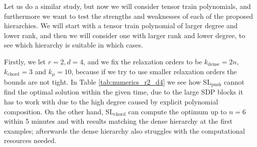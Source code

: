 \documentclass[11pt,a4paper]{article}
\theoremstyle{definition}
\begin{document}
Let us do a similar study, but now we will consider tensor train polynomials, and furthermore we want to test the strengths and weaknesses of each of the proposed hierarchies. We will start with a tensor train polynomial of larger degree and lower rank, and then we will consider one with larger rank and lower degree, to see which hierarchy is suitable in which cases.

Firstly, we let $r=2,d=4$, and we fix the relaxation orders to be $k_{\text{dense}}=2n$, $k_{\text{chord}}=3$ and $k_{\mu}=10$, because if we try to use smaller relaxation orders the bounds are not tight. In Table \ref{tab:numerics_r2_d4} we see how $\mathrm{SL}_{\mathrm{push}}$ cannot find the optimal solution within the given time, due to the large SDP blocks it has to work with due to the high degree caused by explicit polynomial composition. On the other hand, $\mathrm{SL}_{\mathrm{chord}}$ can compute the optimum up to $n=6$ within 5 minutes and with results matching the dense hierarchy at the first examples; afterwards the dense hierarchy also struggles with the computational resources needed.
\end{document}
